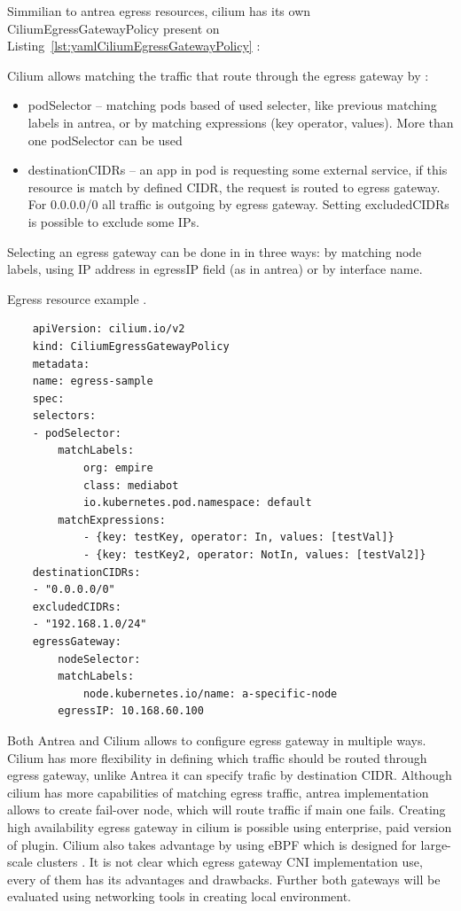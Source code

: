Simmilian to antrea egress resources, cilium has its own CiliumEgressGatewayPolicy present on Listing~\ref{lst:yamlCiliumEgressGatewayPolicy} \cite{CiliumEgressGateway}:

Cilium allows matching the traffic that route through the egress gateway by \cite{CiliumEgressGateway}:
\begin{itemize}
    \item podSelector -- matching pods based of used selecter, like previous matching labels in antrea, or by matching expressions (key operator, values). More than one podSelector can be used
    \item destinationCIDRs -- an app in pod is requesting some external service, if this resource is match by defined CIDR, the request is routed to egress gateway. For 0.0.0.0/0 all traffic is outgoing by egress gateway. Setting excludedCIDRs is possible to exclude some IPs.
\end{itemize}

Selecting an egress gateway can be done in in three ways: by matching node labels, using IP address in egressIP field (as in antrea) or by interface name. 

\begin{listing}[htb]
    \centering
    \caption{Egress resource example \cite{AntreaEgressArch}.}
    \begin{verbatim}
    apiVersion: cilium.io/v2
    kind: CiliumEgressGatewayPolicy
    metadata:
    name: egress-sample
    spec:
    selectors:
    - podSelector:
        matchLabels:
            org: empire
            class: mediabot
            io.kubernetes.pod.namespace: default
        matchExpressions:
            - {key: testKey, operator: In, values: [testVal]}
            - {key: testKey2, operator: NotIn, values: [testVal2]}
    destinationCIDRs:
    - "0.0.0.0/0"
    excludedCIDRs:
    - "192.168.1.0/24"
    egressGateway:
        nodeSelector:
        matchLabels:
            node.kubernetes.io/name: a-specific-node
        egressIP: 10.168.60.100
    \end{verbatim}
    \label{lst:yamlCiliumEgressGatewayPolicy}
\end{listing}


Both Antrea and Cilium allows to configure egress gateway in multiple ways. Cilium has more flexibility in defining which traffic should be routed through egress gateway, unlike Antrea it can specify trafic by destination CIDR. Although cilium has more capabilities of matching egress traffic, antrea implementation allows to create fail-over node, which will route traffic if main one fails. Creating high availability egress gateway in cilium is possible using enterprise, paid version of plugin. Cilium also takes advantage by using eBPF which is designed for large-scale clusters \cite{CiliumOverview}. It is not clear which egress gateway CNI implementation use, every of them has its advantages and drawbacks. Further both gateways will be evaluated using networking tools in creating local environment.




